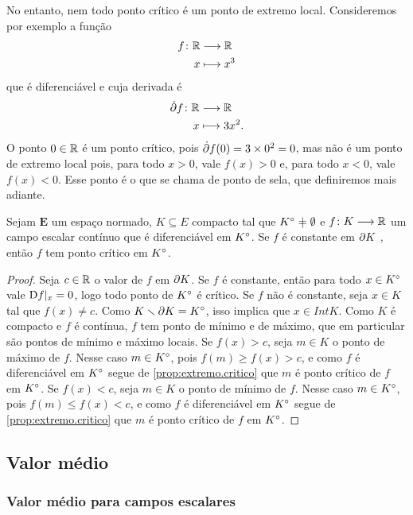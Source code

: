 No entanto, nem todo ponto crítico é um ponto de extremo local. Consideremos por exemplo a função
	\begin{align*}
	{f}\colon {\mathbb{R}} &\longrightarrow {\mathbb{R}} \\{x} &\longmapsto x^3
	\end{align*}
que é diferenciável e cuja derivada é
	\begin{align*}
	{\dot{\partial}f}\colon {\mathbb{R}} &\longrightarrow {\mathbb{R}} \\{x} &\longmapsto 3x^2.
	\end{align*}
O ponto $0 \in \mathbb{R}$ é um ponto crítico, pois $\dot{\partial} f(0) = 3 \times 0^2 = 0$, mas não é um ponto de extremo local pois, para todo $x>0$, vale $f(x)>0$ e, para todo $x<0$, vale $f(x)<0$. Esse ponto é o que se chama de ponto de sela, que definiremos mais adiante.

\begin{proposition}
\label{prop:compacto.critico}
Sejam $\bm E$ um espaço normado, $K \subseteq E$ compacto tal que $\Int{K} \neq \emptyset$ e ${f}\colon {K} \longrightarrow {\mathbb{R}}$ um campo escalar contínuo que é diferenciável em ${K}^\circ$. Se $f$ é constante em $\partial{K}$%
, então $f$ tem ponto crítico em ${K}^\circ$.
\end{proposition}
\begin{proof}
Seja $c \in \mathbb{R}$ o valor de $f$ em $\partial{K}$. Se $f$ é constante, então para todo $x \in {K}^\circ$ vale $\mathrm{D} f|_x = 0$, logo todo ponto de ${K}^\circ$ é crítico. Se $f$ não é constante, seja $x \in K$ tal que $f(x) \neq c$. Como $K \smallsetminus \partial{K} = {K}^\circ$, isso implica que $x \in Int{K}$. Como $K$ é compacto e $f$ é contínua, $f$ tem ponto de mínimo e de máximo, que em particular são pontos de mínimo e máximo locais. Se $f(x) > c$, seja $m \in K$ o ponto de máximo de $f$. Nesse caso $m \in {K}^\circ$, pois $f(m) \geq f(x) > c$, e como $f$ é diferenciável em ${K}^\circ$ segue de \ref{prop:extremo.critico} que $m$ é ponto crítico de $f$ em ${K}^\circ$. Se $f(x) < c$, seja $m \in K$ o ponto de mínimo de $f$. Nesse caso $m \in {K}^\circ$, pois $f(m) \leq f(x) < c$, e como $f$ é diferenciável em ${K}^\circ$ segue de \ref{prop:extremo.critico} que $m$ é ponto crítico de $f$ em ${K}^\circ$.
\end{proof}

\subsection{Valor médio}

\subsubsection{Valor médio para campos escalares}

